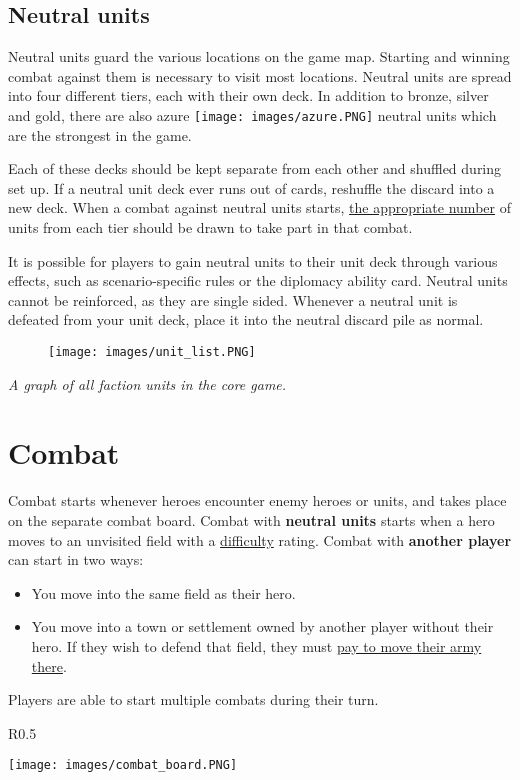 \documentclass[12pt]{article}
\begin{document}
\subsection*{Neutral units}
Neutral units guard the various locations on the game map. Starting and winning combat against them is necessary to visit most locations. Neutral units are spread into four different tiers, each with their own deck. In addition to bronze, silver and gold, there are also azure \texttt{[image: images/azure.PNG]} neutral units which are the strongest in the game.\par
Each of these decks should be kept separate from each other and shuffled during set up. If a neutral unit deck ever runs out of cards, reshuffle the discard into a new deck. When a combat against neutral units starts, \hyperlink{Difficulty}{the appropriate number} of units from each tier should be drawn to take part in that combat.\par
It is possible for players to gain neutral units to their unit deck through various effects, such as scenario-specific rules or the diplomacy ability card. Neutral units cannot be reinforced, as they are single sided. Whenever a neutral unit is defeated from your unit deck, place it into the neutral discard pile as normal.
\begin{figure}[h]
\centering
\texttt{[image: images/unit\_list.PNG]}
\end{figure}
\begin{center}
\textit{A graph of all faction units in the core game.}
\end{center}

\clearpage
\section[Combat]{Combat\hypertarget{Combat}{}}
Combat starts whenever heroes encounter enemy heroes or units, and takes place on the separate combat board. Combat with \textbf{neutral units} starts when a hero moves to an unvisited field with a \hyperlink{Difficulty}{difficulty} rating. Combat with \textbf{another player} can start in two ways:
\begin{itemize}
    \item You move into the same field as their hero.
    \item You move into a town or settlement owned by another player without their hero. If they wish to defend that field, they must \hyperlink{Town}{pay to move their army there}.
\end{itemize}
Players are able to start multiple combats during their turn.
\begin{wrapfigure}{R}{0.5\textwidth}
    \begin{center}
    \texttt{[image: images/combat\_board.PNG]}
    \end{center}
\end{wrapfigure}
\end{document}
